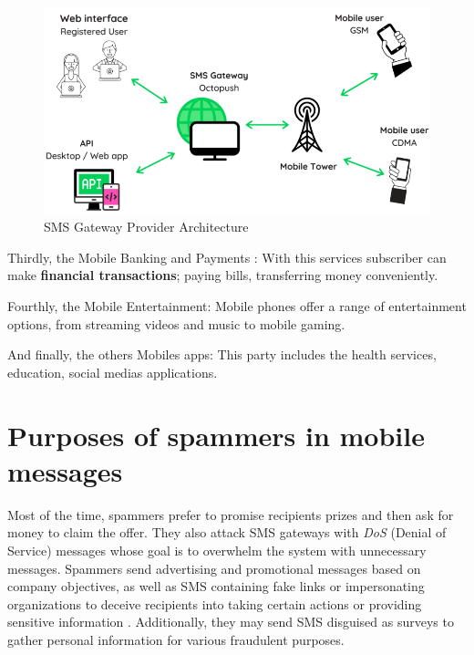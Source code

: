 \documentclass[12pt,a4paper]{report}
\begin{document}
\begin{figure}
	\centering
	\includegraphics[width=1\linewidth]{Images/SMSgateway}
	\caption{SMS Gateway Provider Architecture}
	\label{fig:smsgateway} 
\end{figure}
    
Thirdly, the Mobile Banking and Payments : With this services subscriber can make \textbf{financial transactions}; paying bills, transferring money conveniently. 

Fourthly, the Mobile Entertainment: Mobile phones offer a range of entertainment options, from streaming videos and music to mobile gaming. 

And finally, the others Mobiles apps: This party includes the health services, education, social medias applications.
\section{Purposes of spammers in mobile messages}
Most of the time, spammers prefer to promise recipients prizes and then ask for money to claim the offer. They also attack SMS gateways with \textit{DoS} (Denial of Service) messages \cite{androulidakis2013fimess} whose goal is to overwhelm the system with unnecessary messages. Spammers send advertising and promotional messages based on company objectives, as well as SMS containing fake links or impersonating organizations to deceive recipients into taking certain actions or providing sensitive information \cite{tang2022clues}. Additionally, they may send SMS disguised as surveys to gather personal information for various fraudulent purposes.
\end{document}
